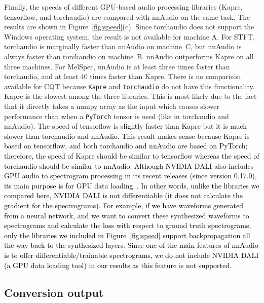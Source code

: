 \documentclass{ieeeaccess}
\newcommand{\nbh}[1]{\texttt{#1}}
\newcommand{\newtext}[1]{\textcolor{black}{#1}} %
\begin{document}
Finally, the speeds of different GPU-based audio processing libraries (Kapre, \newtext{tensorflow}, and torchaudio) are compared with nnAudio on the same task. The results are shown in Figure~\ref{fig:speed}(c). {Since torchaudio does not support the Windows operating system, the result is not available for machine A. For STFT, torchaudio is marginally faster than nnAudio on machine~C, but nnAudio is always faster than torchaudio on machine~B. nnAudio outperforms Kapre on all three machines. For MelSpec, nnAudio is at least three times faster than torchaudio, and at least 40} times faster than Kapre. There is no comparison available for CQT because \nbh{Kapre} and \nbh{torchaudio} do not have this functionality. Kapre is the slowest among the three libraries. This is most likely due to the fact that it directly takes a numpy array as the input which causes slower performance than when a \nbh{PyTorch} tensor is used (like in {torchaudio} and \nbh{}{nnAudio}). \newtext{The speed of tensorflow is slightly faster than Kapre but it is much slower than torchaudio and nnAudio. This result makes sense because Kapre is based on tensorflow, and both torchaudio and nnAudio are based on PyTorch; therefore, the speed of Kapre should be similar to tensorflow whereas the speed of torchaudio should be similar to nnAudio. Although NVIDIA DALI also includes GPU audio to spectrogram processing in its recent releases (since version 0.17.0), its main purpose is for GPU data loading~\cite{zolnouri2020importance, Gayer2019EffectiveRA}. In other words, unlike the libraries we compared here, NVIDIA DALI is not differentiable (it does not calculate the gradient for the spectrograms). For example, if we have waveforms generated from a neural network, and we want to convert these synthesized waveforms to spectrograms and calculate the loss with respect to ground truth spectrograms, only the libraries we included in Figure~\ref{fig:speed} support backpropagation all the way back to the synthesized layers. Since one of the main features of nnAudio is to offer differentiable/trainable spectrograms, we do not include NVIDIA DALI (a GPU data loading tool) in our results as this feature is not supported.}


\subsection{Conversion output}
\end{document}
